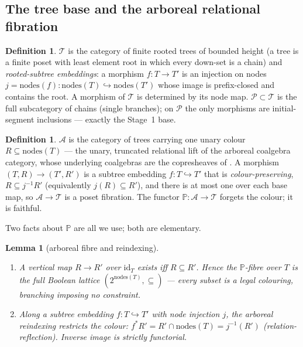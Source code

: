 \documentclass[11pt]{article}
\newtheorem{lemma}[theorem]{Lemma}
\theoremstyle{definition}
\newtheorem{definition}[theorem]{Definition}
\newcommand{\nodes}{\mathrm{nodes}}
\newcommand{\id}{\mathrm{id}}
\newcommand{\Tree}{\mathcal{T}}
\newcommand{\Path}{\mathcal{P}}
\newcommand{\Arb}{\mathcal{A}}
\newcommand{\Pfib}{\mathbb{P}}
\newcommand{\inpr}{\hookrightarrow}
\begin{document}
\subsection{The tree base and the arboreal relational fibration}

\begin{definition}\label{def:tree}
$\Tree$ is the category of finite rooted trees of bounded height (a tree is a finite poset with
least element $\mathrm{root}$ in which every down-set is a chain) and \emph{rooted-subtree
embeddings}: a morphism $f\colon T\to T'$ is an injection on nodes
$j=\nodes(f)\colon\nodes(T)\inpr\nodes(T')$ whose image is prefix-closed and contains the root. A
morphism of $\Tree$ is determined by its node map. $\Path\subset\Tree$ is the full subcategory of
chains (single branches); on $\Path$ the only morphisms are initial-segment inclusions --- exactly
the Stage~1 base.
\end{definition}

\begin{definition}\label{def:arb}
$\Arb$ is the category of trees carrying one unary colour $R\subseteq\nodes(T)$ --- the unary,
truncated relational lift of the arboreal coalgebra category, whose underlying coalgebras are the
copresheaves of \cite[Lemma~4.1]{macbeth-game}. A morphism $(T,R)\to(T',R')$ is a subtree embedding
$f\colon T\inpr T'$ that is \emph{colour-preserving}, $R\subseteq j^{-1}R'$ (equivalently
$j(R)\subseteq R'$), and there is at most one over each base map, so $\Arb\to\Tree$ is a poset
fibration. The functor $\Pfib\colon\Arb\to\Tree$ forgets the colour; it is faithful.
\end{definition}

Two facts about $\Pfib$ are all we use; both are elementary.

\begin{lemma}[arboreal fibre and reindexing]\label{lem:arbfibre}
\begin{enumerate}
\item A vertical map $R\to R'$ over $\id_T$ exists iff $R\subseteq R'$. Hence the $\Pfib$-fibre over
$T$ is the \emph{full} Boolean lattice $(2^{\nodes(T)},\subseteq)$ --- every subset is a legal
colouring, branching imposing no constraint.
\item Along a subtree embedding $f\colon T\inpr T'$ with node injection $j$, the arboreal reindexing
restricts the colour: $f^*R'=R'\cap\nodes(T)=j^{-1}(R')$ (relation-reflection). Inverse image is
strictly functorial.
\end{enumerate}
\end{lemma}
\end{document}
